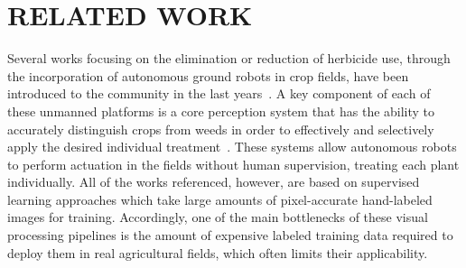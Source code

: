 
 

\section{RELATED WORK}
\label{sec:related}


Several works focusing on the elimination or reduction of herbicide use,
through the incorporation of autonomous ground robots in crop fields, have
been introduced to the community in the last years~\cite{ducket2018arxiv, liebisch2016wslw, mccool2018ral}.
A key component of each of these unmanned platforms is a core perception system that
has the ability to accurately distinguish crops from weeds in order to effectively
and selectively apply the desired individual treatment~\cite{ lottes2018iros, mccool2017ral,milioto2017uavg,milioto2018real, sa2018rs}.
These systems allow autonomous robots to perform actuation in the fields without human supervision, treating each plant individually.
All of the works referenced, however, are based on supervised learning approaches which take large amounts of pixel-accurate hand-labeled images for training. 
Accordingly, one of the main bottlenecks of these visual processing pipelines is the amount of expensive labeled training data required to deploy them in real agricultural fields, which often limits their applicability.

